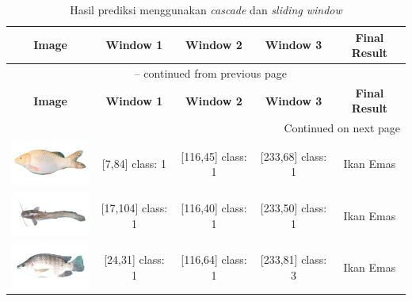 \begin{longtable}{|c|c|c|c|c|}
	\caption{Hasil prediksi menggunakan \emph{cascade} dan \emph{sliding window}} \label{tab: Classification result} \\
	\hline
	\textbf{Image} & \textbf{Window 1} & \textbf{Window 2} & \textbf{Window 3} & \textbf{Final Result} \\
	\hline
	\endfirsthead
	\multicolumn{5}{c}{{\tablename\ \thetable{} -- continued from previous page}} \\
	\hline
	\textbf{Image} & \textbf{Window 1} & \textbf{Window 2} & \textbf{Window 3} & \textbf{Final Result} \\
	\hline
	\endhead
	\hline \multicolumn{5}{|r|}{{Continued on next page}} \\ \hline
	\endfoot
	\hline
	\endlastfoot
	\includegraphics[width=3cm]{gambar/dataset_validasi/M10}
	& [7,84] class: 1 & [116,45] class: 1 & [233,68] class: 1 & Ikan Emas \\
	\hline
	\includegraphics[width=3cm]{gambar/dataset_validasi/L10}
	& [17,104] class: 1 & [116,40] class: 1 & [233,50] class: 1 & Ikan Emas \\
	\hline
	\includegraphics[width=3cm]{gambar/dataset_validasi/N10}
	& [24,31] class: 1 & [116,64] class: 1 & [233,81] class: 3 & Ikan Emas \\
	\hline
\end{longtable}